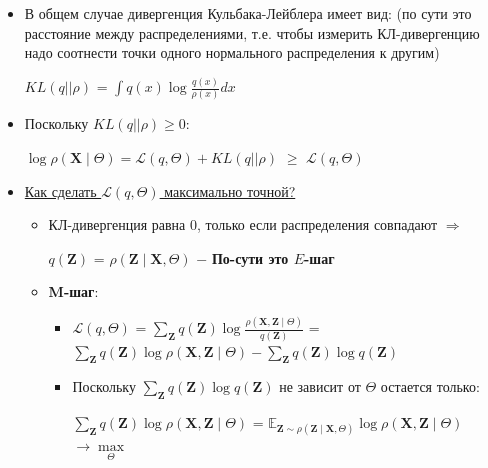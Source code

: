         \begin{itemize}
            \item В общем случае дивергенция Кульбака-Лейблера имеет вид: (по сути это расстояние между распределениями, т.е. чтобы измерить КЛ-дивергенцию надо соотнести точки одного нормального распределения к другим)
            \begin{center}
            \large
                $KL(q || \rho)$ = $\int q(x) \log \frac{q(x)}{\rho(x)} dx$
            \end{center}


            \item Поскольку $KL(q || \rho) \geq 0$:
            \begin{center}
                \Large
                \colorbox{green!20}{$\log \rho(\mathbf{X} \mid \Theta) = \mathcal{L}(q, \Theta) + KL(q || \rho)$ $\geq$ $\mathcal{L}(q, \Theta)$}
            \end{center}

            \item \underline{Как сделать $\mathcal{L}(q, \Theta) $ максимально точной?}
            \begin{itemize}
                \item КЛ-дивергенция равна 0, только если распределения совпадают $\Longrightarrow$
                \begin{center}
                    \Large
                    $q(\mathbf{Z})$ = $\rho(\mathbf{Z} \mid \mathbf{X}, \Theta)$ $-$ \textbf{По-сути это $E$-шаг}
                \end{center}

                \item \textbf{M-шаг}:
                \begin{itemize}
                    \item \begin{center}
                        \Large
                        $\mathcal{L}(q, \Theta) $ = $\sum\limits_{\mathbf{Z}} q(\mathbf{Z}) \log \frac{\rho (\mathbf{X}, \mathbf{Z} \mid \Theta)}{q(\mathbf{Z})}$ = $\sum\limits_{\mathbf{Z}} q(\mathbf{Z}) \log \rho (\mathbf{X}, \mathbf{Z} \mid \Theta) - \sum\limits_{\mathbf{Z}} q(\mathbf{Z}) \log q(\mathbf{Z})$\\
                    \end{center}
    
                    \item Поскольку $\sum\limits_{\mathbf{Z}} q(\mathbf{Z}) \log q(\mathbf{Z})$ не зависит от $\Theta$ остается только:
                    \begin{center}
                        \Large 
                        $\sum\limits_{\mathbf{Z}} q(\mathbf{Z}) \log \rho (\mathbf{X}, \mathbf{Z} \mid \Theta)$ = $\mathbb{E}_{\mathbf{Z} \sim \rho(\mathbf{Z} \mid \mathbf{X}, \Theta)} \log \rho(\mathbf{X}, \mathbf{Z} \mid \Theta)$ $\longrightarrow \max\limits_{\Theta}$
                    \end{center}
                \end{itemize}
              

\end{itemize}
\end{itemize}
